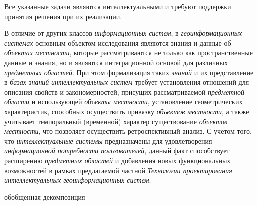 Все указанные задачи являются интеллектуальными и требуют поддержки принятия решения при их реализации.

В отличие от других классов \textit{информационных систем}, в \textit{геоинформационных системах} основным объектом исследования являются знания и данные об \textit{объектах местности}, которые рассматриваются не только как пространственные данные и знания, но и являются интеграционной основой для различных \textit{предметных областей}. При этом формализация таких \textit{знаний} и их представление в \textit{базах знаний} \textit{интеллектуальных систем} требует установления отношений для описания свойств и закономерностей, присущих рассматриваемой \textit{предметной области} и использующей \textit{объекты местности}, установление геометрических характеристик, способных осуществить привязку \textit{объектов местности}, а также учитывает темпоральный (временной) характер существование \textit{объектов местности}, что позволяет осуществить ретроспективный анализ. С учетом того, что \textit{интеллектуальные системы} предназначены для удовлетворения \textit{информационной потребности пользователей}, данный факт способствует расширению \textit{предметных областей} и добавления новых функциональных возможностей в рамках предлагаемой частной \textit{Технологии проектирования интеллектуальных геоинформационных систем}.

\begin{SCn}
\begin{scnindent}
	\begin{scnrelfromset}{обобщенная декомпозиция}
	\end{scnrelfromset}
\end{scnindent}
\end{SCn}

